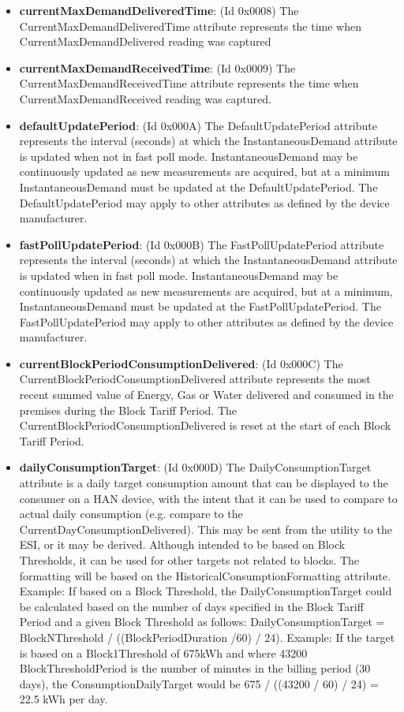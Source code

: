 \begin{itemize}
\item \textbf{currentMaxDemandDeliveredTime}: (Id 0x0008) The CurrentMaxDemandDeliveredTime attribute represents the time when CurrentMaxDemandDelivered reading was captured
\item \textbf{currentMaxDemandReceivedTime}: (Id 0x0009) The CurrentMaxDemandReceivedTime attribute represents the time when CurrentMaxDemandReceived reading was captured.
\item \textbf{defaultUpdatePeriod}: (Id 0x000A) The DefaultUpdatePeriod attribute represents the interval (seconds) at which the InstantaneousDemand attribute is updated when not in fast poll mode. InstantaneousDemand may be continuously updated as new measurements are acquired, but at a minimum InstantaneousDemand must be updated at the DefaultUpdatePeriod. The DefaultUpdatePeriod may apply to other attributes as defined by the device manufacturer.
\item \textbf{fastPollUpdatePeriod}: (Id 0x000B) The FastPollUpdatePeriod attribute represents the interval (seconds) at which the InstantaneousDemand attribute is updated when in fast poll mode. InstantaneousDemand may be continuously updated as new measurements are acquired, but at a minimum, InstantaneousDemand must be updated at the FastPollUpdatePeriod. The FastPollUpdatePeriod may apply to other attributes as defined by the device manufacturer.
\item \textbf{currentBlockPeriodConsumptionDelivered}: (Id 0x000C) The CurrentBlockPeriodConsumptionDelivered attribute represents the most recent summed value of Energy, Gas or Water delivered and consumed in the premises during the Block Tariff Period. The CurrentBlockPeriodConsumptionDelivered is reset at the start of each Block Tariff Period.
\item \textbf{dailyConsumptionTarget}: (Id 0x000D) The DailyConsumptionTarget attribute is a daily target consumption amount that can be displayed to the consumer on a HAN device, with the intent that it can be used to compare to actual daily consumption (e.g. compare to the CurrentDayConsumptionDelivered). This may be sent from the utility to the ESI, or it may be derived. Although intended to be based on Block Thresholds, it can be used for other targets not related to blocks. The formatting will be based on the HistoricalConsumptionFormatting attribute. Example: If based on a Block Threshold, the DailyConsumptionTarget could be calculated based on the number of days specified in the Block Tariff Period and a given Block Threshold as follows: DailyConsumptionTarget = BlockNThreshold / ((BlockPeriodDuration /60) / 24). Example: If the target is based on a Block1Threshold of 675kWh and where 43200 BlockThresholdPeriod is the number of minutes in the billing period (30 days), the ConsumptionDailyTarget would be 675 / ((43200 / 60) / 24) = 22.5 kWh per day.

\end{itemize}
